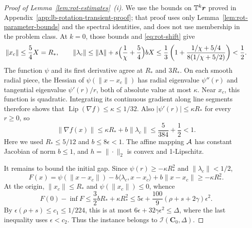 \begin{proof}[Proof of Lemma~\ref{lem:rot-estimates}~(i)]
We use the bounds on \(\mathbb T^k\bm{r}\) proved in
Appendix~\ref{app:lb-rotation-transient-proof}; that proof uses only
Lemma~\ref{lem:rot-parameter-bounds} and the spectral identities, and does
not use membership in the problem class. At \(k=0\), those bounds and
\eqref{eq:rot-shift} give
\[
\|x_c\|\le\frac54X=R_*,\qquad
\|\lambda_c\|\le\|\Lambda\|+s\Bigl(\frac1\chi+\frac54\Bigr)bX
\le\frac13\left(1+\frac{1/\chi+5/4}{8(1/\chi+5/2)}\right)<\frac12.
\]
The function \(\psi\) and its first derivative agree at \(R_*\) and
\(3R_*\). On each smooth radial piece, the Hessian of
\(\psi(\|x-x_c\|)\) has radial eigenvalue \(\psi''(r)\) and tangential
eigenvalue \(\psi'(r)/r\), both of absolute value at most \(\kappa\).
Near \(x_c\), this function is quadratic. Integrating its continuous
gradient along line segments therefore shows that
\(\operatorname{Lip}(\nabla f)\le\kappa\le1/32\).
Also \(|\psi'(r)|\le\kappa R_*\) for every \(r\ge0\), so
\[
\|\nabla f(x)\|\le\kappa R_*+b\|\lambda_c\|
\le\frac5{384}+\frac12<1.
\]
Here we used \(R_*\le5/12\) and \(b\le8\epsilon<1\).
The affine mapping \(\mathcal{A}\) has constant Jacobian of norm \(b\le1\),
and \(h=\|\cdot\|_2\) is convex and 1-Lipschitz.

It remains to bound the initial gap. Since \(\psi(r)\ge-\kappa R_*^2\)
and \(\|\lambda_c\|<1/2\),
\[
F(x)=\psi(\|x-x_c\|)-b\langle\lambda_c,x-x_c\rangle+b\|x-x_c\|
\ge-\kappa R_*^2.
\]
At the origin, \(\|x_c\|\le R_*\) and \(\psi(\|x_c\|)\le0\), whence
\[
F(0)-\inf F\le\frac32bR_*+\kappa R_*^2
\le5\epsilon+\frac{100}{9}(\rho+s+2\gamma)\epsilon^2.
\]
By \(\epsilon(\rho+s)\le c_1\le1/224\), this is at most
\(6\epsilon+32\gamma\epsilon^2\le\Delta\), where the last inequality
uses \(\epsilon<c_2\). Thus the instance belongs to
\(\mathcal I(\mathbf C_0,\Delta)\).
\end{proof}

